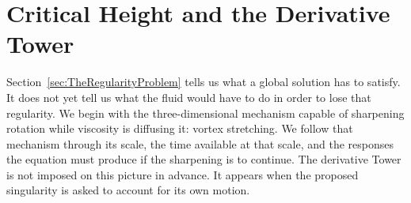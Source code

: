 \section{Critical Height and the Derivative Tower}\label{sec:CriticalHeightAndDerivativeTower}

Section~\ref{sec:TheRegularityProblem} tells us what a global solution has to
satisfy.  It does not yet tell us what the fluid would have to do in order to
lose that regularity.  We begin with the three-dimensional mechanism capable
of sharpening rotation while viscosity is diffusing it: vortex stretching.
We follow that mechanism through its scale, the time available at that scale,
and the responses the equation must produce if the sharpening is to continue.
The derivative Tower is not imposed on this picture in advance.  It appears
when the proposed singularity is asked to account for its own motion.




